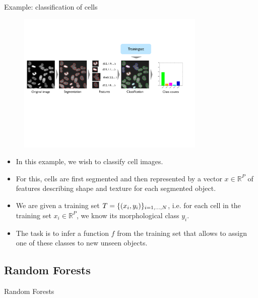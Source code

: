\documentclass[xcolor=pdftex,dvipsnames,table]{beamer}
\begin{document}
\begin{frame}{Example: classification of cells}
\begin{figure}[htb]
\includegraphics[width=0.8\textwidth]{../graphics/ComputationalPhenotyping.pdf}
\end{figure}

\begin{itemize}
	\item In this example, we wish to classify cell images. 
	\item For this, cells are first segmented and then represented by a vector $x \in \mathbb{R}^P$ of features describing shape and texture for each segmented object.
	\item We are given a training set $T = \{(x_i, y_i)\}_{i=1, \ldots, N}$, i.e. for each cell in the training set $x_i \in \mathbb{R}^P$, we know its morphological class $y_i$. 
	\item The task is to infer a function $f$ from the training set that allows to assign one of these classes to new unseen objects.
\end{itemize}
\end{frame}

\subsection{Random Forests}
\begin{frame}[plain,c]
\begin{center}
\Huge Random Forests
\end{center}
\end{frame}
\end{document}
